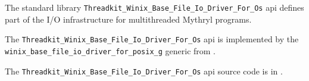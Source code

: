 
The standard library {\tt Threadkit\_Winix\_Base\_File\_Io\_Driver\_For\_Os} api defines part of the I/O infrastructure for multithreaded Mythryl programs.

The {\tt Threadkit\_Winix\_Base\_File\_Io\_Driver\_For\_Os} api is implemented by 
the {\tt winix\_base\_file\_io\_driver\_for\_posix\_g} generic from 
.

The {\tt Threadkit\_Winix\_Base\_File\_Io\_Driver\_For\_Os} api source code is in .






